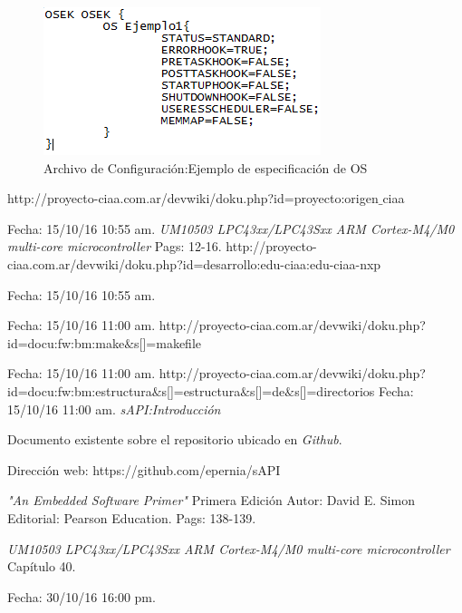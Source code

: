 \documentclass[12pt,letterpaper]{article}
\begin{document}
\begin{figure}[!h]
\centering
\includegraphics[width=5 cm]{figuras/f20.png}
\caption{Archivo de Configuración:Ejemplo de especificación de OS}
\label{Fig37}
\end{figure}

\begin{thebibliography}{}
 {\footnotesize http://proyecto-ciaa.com.ar/devwiki/doku.php?id=proyecto:origen$\_$ciaa}

Fecha: 15/10/16 10:55 am.
\textit{UM10503
LPC43xx/LPC43Sxx ARM Cortex-M4/M0 multi-core
microcontroller} Pags: 12-16.
 {\footnotesize http://proyecto-ciaa.com.ar/devwiki/doku.php?id=desarrollo:edu-ciaa:edu-ciaa-nxp}

Fecha: 15/10/16 10:55 am.
\

Fecha: 15/10/16 11:00 am.
 {\footnotesize http://proyecto-ciaa.com.ar/devwiki/doku.php?id=docu:fw:bm:make$\&$s[]=makefile}

Fecha: 15/10/16 11:00 am.
 {\footnotesize http://proyecto-ciaa.com.ar/devwiki/doku.php?id=docu:fw:bm:estructura$\&$s[]=estructura$\&$s[]=de$\&$s[]=directorios} Fecha: 15/10/16 11:00 am.
\textit{sAPI:Introducción}

Documento existente sobre el repositorio ubicado en \textit{Github}.

Dirección web: https://github.com/epernia/sAPI

\textit{"An Embedded Software Primer"} Primera Edición Autor: David E. Simon Editorial: Pearson Education. Pags: 138-139.

 \textit{UM10503 LPC43xx/LPC43Sxx ARM Cortex-M4/M0 multi-core microcontroller} Capítulo 40.


Fecha: 30/10/16 16:00 pm.
\end{thebibliography}
\end{document}
